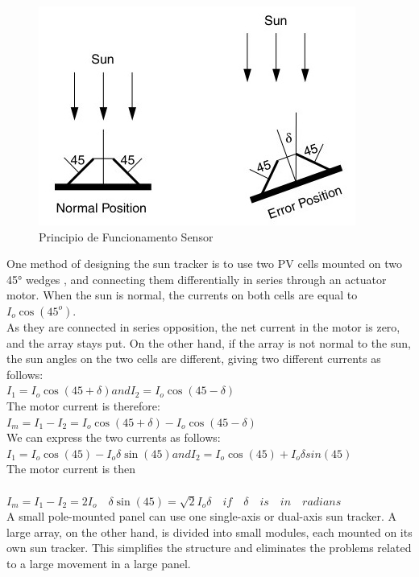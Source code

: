 \newpage

\begin{figure}[H]
	\centering
	\includegraphics[scale=0.52]{./image/Sensor_Actuator_Principle.jpg}
	\caption{Principio de Funcionamento Sensor \cite{book_2}}
\end{figure}

One method of designing the sun tracker is to use two PV cells mounted on two 45° wedges , and connecting them differentially in series through an actuator motor. When the sun is normal, the currents on both cells are equal to $I_o \cos (45^o)$. \\

As they are connected in series opposition, the net current in the motor is zero, and the array stays put. On the other hand, if the array is not normal to the sun, the sun angles on the two cells are different, giving two different currents as follows: \\
$I_1 = I_o \cos(45 + \delta) and I_2 = I_o \cos(45 - \delta)$ \\
The motor current is therefore: \\
$I_m = I_1 - I_2 = I_o \cos(45 + \delta) - I_o \cos(45 - \delta)$ \\
We can express the two currents as follows: \\
$I_1 = I_o \cos (45) - I_o \delta \sin (45) and I_2 = I_o \cos (45) + I_o \delta sin (45)$ \\
The motor current is then\\
\\
$I_m = I_1 - I_2 = 2 I_o \quad \delta \sin (45) = \sqrt{2} I_o \delta \quad if \quad \delta \quad is \quad in \quad radians$ \\
A small pole-mounted panel can use one single-axis or dual-axis sun tracker. A large array, on the other hand, is divided into small modules, each mounted on its own sun tracker. This simplifies the structure and eliminates the problems related to a large movement in a large panel.



